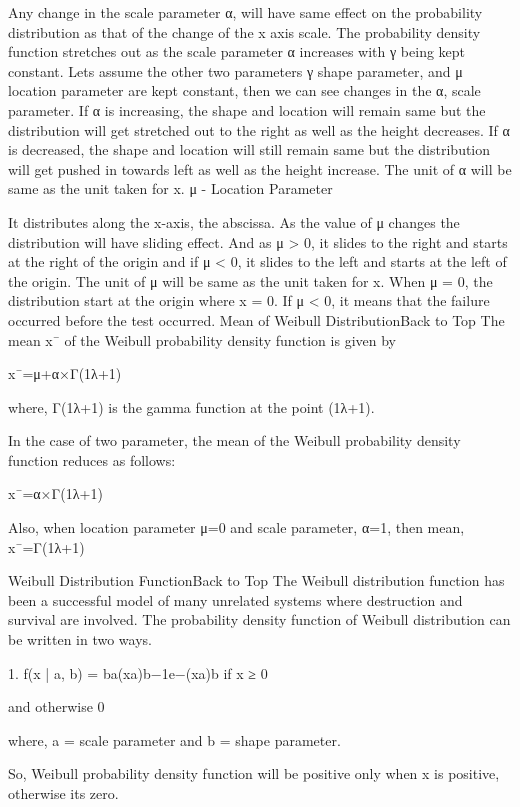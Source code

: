 \documentclass{beamer}
\begin{document}
	Any change in the scale parameter α, will have same effect on the probability distribution as that of the change of the x axis scale. The probability density function stretches out as the scale parameter α increases with γ being kept constant. Lets assume the other two parameters γ shape parameter, and μ location parameter are kept constant, then we can see changes in the α, scale parameter.
	If α is increasing, the shape and location will remain same but the distribution will get stretched out to the right as well as the height decreases.
	If α is decreased, the shape and location will still remain same but the distribution will get pushed in towards left as well as the height increase.
	The unit of α will be same as the unit taken for x.
	μ - Location Parameter
	
	It distributes along the x-axis, the abscissa. As the value of μ changes the distribution will have sliding effect. And as μ > 0, it slides to the right and starts at the right of the origin and if μ < 0, it slides to the left and starts at the left of the origin. The unit of μ will be same as the unit taken for x.
	When μ = 0, the distribution start at the origin where x = 0.
	If μ < 0, it means that the failure occurred before the test occurred.
	Mean of Weibull DistributionBack to Top
	The mean x¯ of the Weibull probability density function is given by 
	
	x¯=μ+α×Γ(1λ+1)
	
	where, Γ(1λ+1) is the gamma function at the point (1λ+1).
	
	In the case of two parameter, the mean of the Weibull probability density function reduces as follows: 
	
	x¯=α×Γ(1λ+1)
	
	Also, when location parameter μ=0 and scale parameter, α=1, then mean, x¯=Γ(1λ+1)
	
	Weibull Distribution FunctionBack to Top
	The Weibull distribution function has been a successful model of many unrelated systems where destruction and survival are involved. The probability density function of Weibull distribution can be written in two ways.
	
	1. f(x | a, b) = ba(xa)b−1e−(xa)b if x ≥ 0
	
	and otherwise 0 
	
	where, a = scale parameter and b = shape parameter.
	
	So, Weibull probability density function will be positive only when x is positive, otherwise its zero.
	
\end{document}
